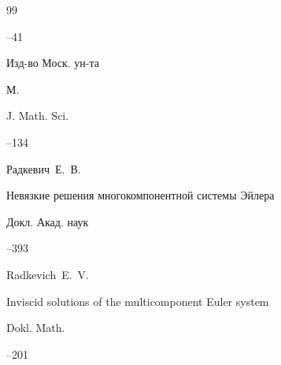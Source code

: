 \begin{thebibliography}{99}


--41

\publ Изд-во Моск. ун-та

\publaddr М.


\transl

\jour J. Math. Sci. 




--134






\by Радкевич~Е.~В.

\paper Невязкие решения многокомпонентной системы Эйлера

\jour Докл. Акад. наук




--393


\transl

\by Radkevich~E.~V.

\paper Inviscid solutions of the multicomponent Euler system

\jour Dokl. Math.




--201










\end{thebibliography}
